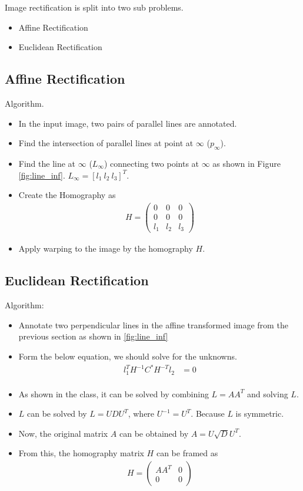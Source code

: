 \documentclass{article}
\begin{document}
Image rectification is split into two sub problems.
\begin{itemize}
    \item Affine Rectification
    \item Euclidean Rectification
\end{itemize}

\subsection{Affine Rectification}
Algorithm.
\begin{itemize}
    \item In the input image, two pairs of parallel lines are annotated.
    \item Find the intersection of parallel lines at point at $\infty$ ($p_{\infty}$).
    \item Find the line at $\infty$ ($L_{\infty}$) connecting two points at $\infty$ as shown in Figure \ref{fig:line_inf}. $L_\infty = [l_1\ l_2\ l_3]^T$.
    \item Create the Homography as 
    \begin{align*}
    H = \begin{pmatrix} 0 & 0 & 0 \\ 0 & 0 & 0 \\ l_1 & l_2 & l_3 \end{pmatrix}
    \end{align*}
    \item Apply warping to the image by the homography $H$.
\end{itemize}

\subsection{Euclidean Rectification}
Algorithm:
\begin{itemize}
    \item Annotate two perpendicular lines in the affine transformed image from the previous section as shown in \ref{fig:line_inf}
    \item Form the below equation, we should solve for the unknowns.
    \begin{align*}
    l_1^T H^{-1} C^* H^{-T} l_2 &= 0 \\
    \end{align*}
    \item As shown in the class, it can be solved by combining $L = AA^T$ and solving $L$.
    \item $L$ can be solved by $L = UDU^T$, where $U^{-1} = U^T$. Because $L$ is symmetric.
    \item Now, the original matrix $A$ can be obtained by $A = U\sqrt{D}U^T$.
    \item From this, the homography matrix $H$ can be framed as 
    \begin{align*}
    H = \begin{pmatrix} AA^T & 0  \\ 0 & 0 \end{pmatrix}
    \end{align*}
\end{itemize}
\end{document}

